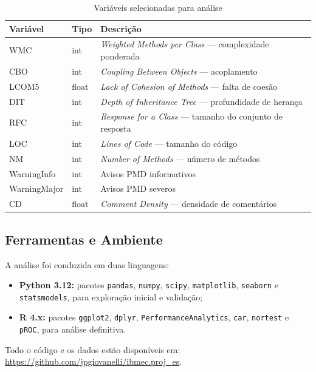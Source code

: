 \documentclass[12pt]{article}
\begin{document}
\begin{table}[H]
\centering
\caption{Variáveis selecionadas para análise}
\label{tab:variaveis}
\begin{tabular}{llp{6cm}}
\toprule
\textbf{Variável} & \textbf{Tipo} & \textbf{Descrição} \\
\midrule
WMC          & int   & \textit{Weighted Methods per Class} — complexidade ponderada \\
CBO          & int   & \textit{Coupling Between Objects} — acoplamento \\
LCOM5        & float & \textit{Lack of Cohesion of Methods} — falta de coesão \\
DIT          & int   & \textit{Depth of Inheritance Tree} — profundidade de herança \\
RFC          & int   & \textit{Response for a Class} — tamanho do conjunto de resposta \\
LOC          & int   & \textit{Lines of Code} — tamanho do código \\
NM           & int   & \textit{Number of Methods} — número de métodos \\
WarningInfo  & int   & Avisos PMD informativos \\
WarningMajor & int   & Avisos PMD severos \\
CD           & float & \textit{Comment Density} — densidade de comentários \\
\bottomrule
\end{tabular}
\end{table}

\subsection{Ferramentas e Ambiente}

A análise foi conduzida em duas linguagens:
\begin{itemize}
  \item \textbf{Python 3.12:} pacotes \texttt{pandas}, \texttt{numpy},
        \texttt{scipy}, \texttt{matplotlib}, \texttt{seaborn} e
        \texttt{statsmodels}, para exploração inicial e validação;
  \item \textbf{R 4.x:} pacotes \texttt{ggplot2}, \texttt{dplyr},
        \texttt{PerformanceAnalytics}, \texttt{car}, \texttt{nortest}
        e \texttt{pROC}, para análise definitiva.
\end{itemize}

Todo o código e os dados estão disponíveis em:
\url{https://github.com/jpgiovanelli/ibmec.proj_es}.
\end{document}
